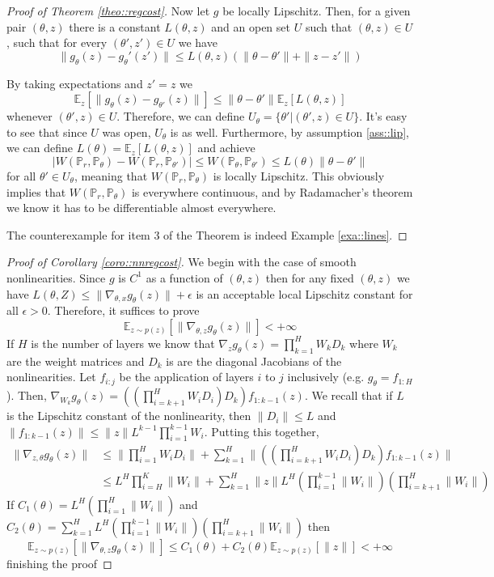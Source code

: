 \documentclass{article} %
\newcommand\EE{\mathbb{E}}
\newcommand\PP{\mathbb{P}}
\theoremstyle{definition}
\theoremstyle{definition}
\begin{document}
\begin{appendices}
\begin{proof}[Proof of Theorem \ref{theo::regcost}]
Now let $g$ be locally Lipschitz. Then, for a given
pair $(\theta, z)$ there is a constant $L(\theta, z)$
and an open set $U$ such that $(\theta, z) \in U$,
such that for every $(\theta', z') \in U$ we have
$$ \|g_\theta(z) - g_\theta'(z')\| \leq L(\theta, z) (\|\theta - \theta'\| + \|z - z'\|) $$

By taking expectations and $z'=z$ we
$$ \EE_z[\|g_\theta(z) - g_{\theta'}(z)\|] 
  \leq \|\theta - \theta'\| \EE_z[L(\theta, z)] $$
whenever $(\theta', z) \in U$. Therefore, we can define
$U_\theta = \{\theta' | (\theta', z) \in U\}$. It's easy
to see that since $U$ was open, $U_\theta$ is as well.
Furthermore, by assumption \ref{ass::lip}, we can
define $L(\theta) = \EE_z[L(\theta, z)]$ and achieve
$$ |W(\PP_r, \PP_\theta) - W(\PP_r, \PP_{\theta'})| 
\leq W(\PP_\theta, \PP_{\theta'}) 
\leq L(\theta) \|\theta - \theta'\| $$
for all $\theta' \in U_\theta$, meaning that $W(\PP_r, \PP_\theta)$
is locally Lipschitz. This obviously implies that
$W(\PP_r, \PP_\theta)$ is everywhere continuous, and
by Radamacher's theorem we know it has to be differentiable
almost everywhere.

The counterexample for item 3 of the Theorem is indeed
Example \autoref{exa::lines}.
\end{proof}

\begin{proof}[Proof of Corollary \autoref{coro::nnregcost}]
We begin with the case of smooth nonlinearities. Since $g$ is
$C^1$ as a function of $(\theta, z)$ then for any
fixed $(\theta, z)$ we have $L(\theta, Z) \leq \|\nabla_{\theta, x}g_\theta(z)\| + \epsilon$
is an acceptable local Lipschitz constant for all $\epsilon > 0$.
Therefore, it suffices to prove
$$\EE_{z \sim p(z)}[\|\nabla_{\theta, z} g_\theta(z)\|]< +\infty$$
If $H$ is the number of layers we know
that $\nabla_z g_\theta(z) = \prod_{k=1}^H W_k D_k$ where
$W_k$ are the weight matrices and $D_k$ is are the diagonal Jacobians
of the nonlinearities. Let $f_{i:j}$ be the application
of layers $i$ to $j$ inclusively (e.g. $g_\theta = f_{1:H}$).
Then, $\nabla_{W_k} g_\theta(z) = \left(\left(\prod_{i=k+1}^H W_i D_i
\right) D_k \right) f_{1:k-1}(z)$.
We recall that if $L$ is the Lipschitz constant
of the nonlinearity, then $\|D_i\|\leq L$ and
$\|f_{1:k-1}(z)\| \leq \|z\| L^{k-1} \prod_{i=1}^{k-1}W_i$. Putting this together,
\begin{align*}
  \|\nabla_{z, \theta} g_\theta(z)\| &\leq \|\prod_{i=1}^H W_i D_i\|
+ \sum_{k=1}^H \|\left(\left(\prod_{i=k+1}^H W_i D_i \right) D_k \right) 
f_{1:k-1}(z)\| \\
  &\leq L^H \prod_{i=H}^K \|W_i\| + \sum_{k=1}^H \|z\| L^H 
\left(\prod_{i=1}^{k-1} \|W_i\| \right)
\left(\prod_{i=k+1}^{H} \|W_i\| \right)
\end{align*}
If $C_1(\theta) = L^H\left(\prod_{i=1}^H\|W_i\|\right)$ and
$C_2(\theta) = \sum_{k=1}^H L^H 
\left(\prod_{i=1}^{k-1} \|W_i\| \right)
\left(\prod_{i=k+1}^{H} \|W_i\| \right)$ then
$$\EE_{z \sim p(z)}[\|\nabla_{\theta, z} g_\theta(z)\|] 
\leq C_1(\theta) + C_2(\theta) \EE_{z \sim p(z)}[\|z\|] < +\infty$$
finishing the proof
\end{proof}



\end{appendices}
\end{document}
